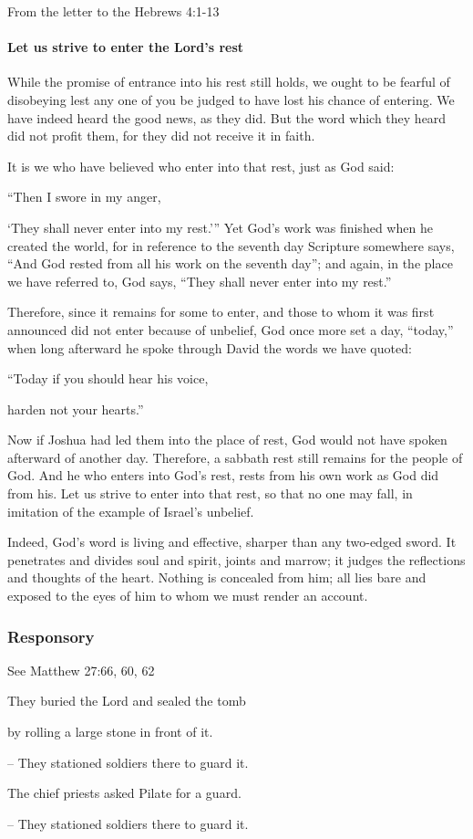 From the letter to the Hebrews \hfill 4:1-13

\paragraph{Let us strive to enter the Lord’s rest}

\lettrine[lines=3]{W}{}hile the promise of entrance into his rest still holds, we ought to be fearful of disobeying lest any one of you be judged to have lost his chance of entering. We have indeed heard the good news, as they did. But the word which they heard did not profit them, for they did not receive it in faith.

It is we who have believed who enter into that rest, just as God said:

\vspace{5pt}
 “Then I swore in my anger,\par
    ‘They shall never enter into my rest.’”
\vspace{5pt}
Yet God’s work was finished when he created the world, for in reference to the seventh day Scripture somewhere says, “And God rested from all his work on the seventh day”; and again, in the place we have referred to, God says, “They shall never enter into my rest.”

Therefore, since it remains for some to enter, and those to whom it was first announced did not enter because of unbelief, God once more set a day, “today,” when long afterward he spoke through David the words we have quoted:

\vspace{5pt}
   “Today if you should hear his voice,\par
      harden not your hearts.”
\vspace{5pt}

Now if Joshua had led them into the place of rest, God would not have spoken afterward of another day. Therefore, a sabbath rest still remains for the people of God. And he who enters into God’s rest, rests from his own work as God did from his. Let us strive to enter into that rest, so that no one may fall, in imitation of the example of Israel’s unbelief.

Indeed, God’s word is living and effective, sharper than any two-edged sword. It penetrates and divides soul and spirit, joints and marrow; it judges the reflections and thoughts of the heart. Nothing is concealed from him; all lies bare and exposed to the eyes of him to whom we must render an account.


\subsubsection{Responsory}
\hfill See Matthew 27:66, 60, 62

They buried the Lord and sealed the tomb\par
by rolling a large stone in front of it.\par
– They stationed soldiers there to guard it.\par
\vspace{5pt}
The chief priests asked Pilate for a guard.\par
– They stationed soldiers there to guard it.
